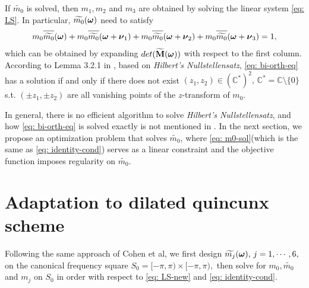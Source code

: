 If $\widetilde{m_0}$ is solved, then $m_1,m_2$ and $m_3$ are obtained by solving the linear system \eqref{eq: LS}.
In particular, $\widetilde{m_{0}}(\boldsymbol{\omega})$ need to satisfy 
\begin{align}\label{eq: bi-orth-eq}
m_0\sbarm{0} + m_0\sbarmn{0}{1} + m_0\sbarmn{0}{2} + m_0\sbarmn{0}{3} = 1,
\end{align}
which can be obtained by expanding $det(\widetilde{\mathbf{M}}(\boldsymbol{\omega}))$ with respect to the first column.
According to Lemma 3.2.1 in \cite{cohen1993compactly}, based on {\it Hilbert's Nullstellensatz}, \eqref{eq: bi-orth-eq} has a solution if and only if there does not exist $(z_1,z_2)\in (\mathbb{C}^*)^2,\, \mathbb{C}^* = \mathbb{C}\setminus\{0\}$\, s.t. $(\pm z_1,\pm z_2)$ are all 
vanishing points of the $z$-transform of $m_0$.

In general, there is no efficient algorithm to solve {\it Hilbert's Nullstellensatz}, and how \eqref{eq: bi-orth-eq} is solved exactly is not mentioned in \cite{cohen1993compactly}.
In the next section, we propose an optimization problem that solves $\widetilde{m_0}$, where \eqref{eq: m0-sol}(which is the same as \eqref{eq: identity-cond}) serves as a linear constraint and the objective function imposes regularity on $\widetilde{m_0}$.


\section{Adaptation to dilated quincunx scheme}\label{sec: solve-quincunx}

Following the same approach of Cohen et al, we first design $\widetilde{m_{j}}(\boldsymbol{\omega}),\,j = 1,\cdots,6,$ on the canonical frequency square $S_0 = [-\pi,\pi)\times[-\pi,\pi),$ then solve for $m_0,\widetilde{m_0}$ and $m_j$ on $S_0$ in order with respect to \eqref{eq: LS-new} and \eqref{eq: identity-cond}.

